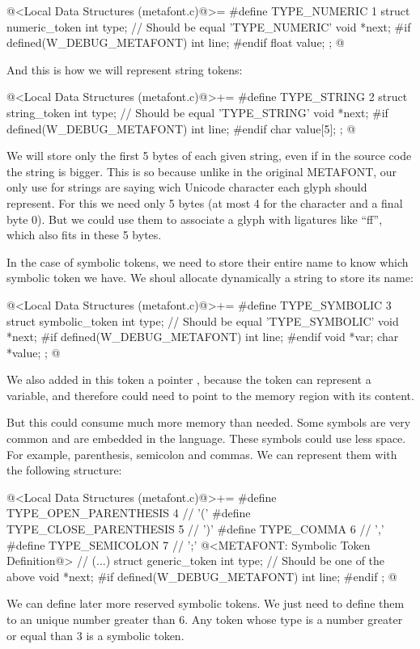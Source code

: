 \iniciocodigo
@<Local Data Structures (metafont.c)@>=
#define TYPE_NUMERIC 1
struct numeric_token{
  int type;   // Should be equal 'TYPE_NUMERIC'
  void *next;
#if defined(W_DEBUG_METAFONT)
  int line;
#endif
  float value;
};
@
\fimcodigo

And this is how we will represent string tokens:

\iniciocodigo
@<Local Data Structures (metafont.c)@>+=
#define TYPE_STRING 2
struct string_token{
  int type;   // Should be equal 'TYPE_STRING'
  void *next;
#if defined(W_DEBUG_METAFONT)
  int line;
#endif
  char value[5];
};
@
\fimcodigo

We will store only the first 5 bytes of each given string, even if in
the source code the string is bigger. This is so because unlike in the
original METAFONT, our only use for strings are saying wich Unicode
character each glyph should represent. For this we need only 5 bytes
(at most 4 for the character and a final byte 0). But we could use
them to associate a glyph with ligatures like ``ff'', which also fits
in these 5 bytes.

In the case of symbolic tokens, we need to store their entire name to
know which symbolic token we have. We shoul allocate dynamically
a string to store its name:

\iniciocodigo
@<Local Data Structures (metafont.c)@>+=
#define TYPE_SYMBOLIC 3
struct symbolic_token{
  int type;   // Should be equal 'TYPE_SYMBOLIC'
  void *next;
#if defined(W_DEBUG_METAFONT)
  int line;
#endif
  void *var;
  char *value;
};
@
\fimcodigo

We also added in this token a pointer , because the
token can represent a variable, and therefore could need to point to
the memory region with its content.

But this could consume much more memory than needed. Some symbols are
very common and are embedded in the language. These symbols could use
less space. For example, parenthesis, semicolon and commas. We can
represent them with the following structure:

\iniciocodigo
@<Local Data Structures (metafont.c)@>+=
#define TYPE_OPEN_PARENTHESIS  4 // '('
#define TYPE_CLOSE_PARENTHESIS 5 // ')'
#define TYPE_COMMA             6 // ','
#define TYPE_SEMICOLON         7 // ';'
@<METAFONT: Symbolic Token Definition@>
// (...)
struct generic_token{
  int type;   // Should be one of the above
  void *next;
#if defined(W_DEBUG_METAFONT)
  int line;
#endif
};
@
\fimcodigo

We can define later more reserved symbolic tokens. We just need to
define them to an unique number greater than 6. Any token whose type
is a number greater or equal than 3 is a symbolic token.

